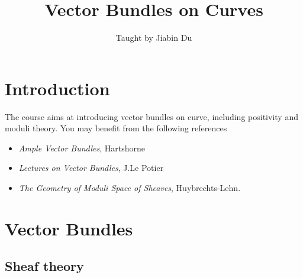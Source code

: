 \documentclass{ctexart}
\title{Vector Bundles on Curves}
\author{Taught by Jiabin Du}
\date{}
\begin{document}
\maketitle
\newpage

\tableofcontents
\newpage

\section*{Introduction}
\label{section:Introduction}

The course aims at introducing vector bundles on curve, including positivity and moduli theory.
You may benefit from the following references
\begin{itemize}
    \item \emph{Ample Vector Bundles}, Hartshorne
    \item \emph{Lectures on Vector Bundles}, J.Le Potier
    \item \emph{The Geometry of Moduli Space of Sheaves}, Huybrechts-Lehn.
\end{itemize}

\section{Vector Bundles}
\label{section:Vector_Bundles}

\subsection{Sheaf theory}
\label{subsection:Vector_Bundles_Sheaf_theory}
\end{document}
